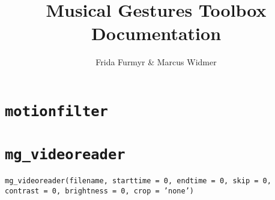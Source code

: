 \documentclass[9pt]{extarticle}
\title{Musical Gestures Toolbox\\ \large{Documentation}}
\author{Frida Furmyr \& Marcus Widmer}
\begin{document}
\maketitle
\section*{\texttt{motionfilter}}
\section*{\texttt{mg\_videoreader}}
\hspace{20pt}\texttt{mg\_videoreader(filename, starttime = 0, endtime = 0, skip = 0, contrast = 0, brightness = 0, crop = 'none')}
\end{document}
